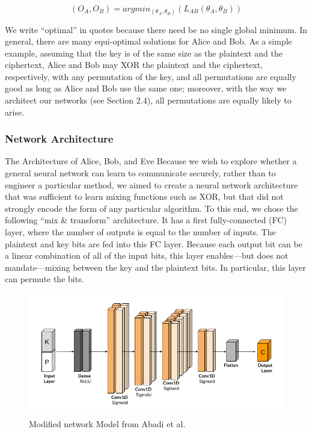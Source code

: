 \documentclass[a4paper]{article}
\begin{document}
      \[ (O_{A}, O_{B}) = argmin_{(\theta_{A}, \theta_{B})}(L_{AB}(\theta_{A}, \theta_{B})) \]
      
      We write “optimal” in quotes because there need be no single global minimum. In general, there
      are many equi-optimal solutions for Alice and Bob. As a simple example, assuming that the key is
      of the same size as the plaintext and the ciphertext, Alice and Bob may XOR the plaintext and the
      ciphertext, respectively, with any permutation of the key, and all permutations are equally good as
      long as Alice and Bob use the same one; moreover, with the way we architect our networks (see
      Section 2.4), all permutations are equally likely to arise.

      \subsubsection{Network Architecture} \label{sec:anc_netarch}
      The Architecture of Alice, Bob, and Eve Because we wish to explore whether a general neural
      network can learn to communicate securely, rather than to engineer a particular method, we aimed
      to create a neural network architecture that was sufficient to learn mixing functions such as XOR,
      but that did not strongly encode the form of any particular algorithm.
      To this end, we chose the following “mix \& transform” architecture. It has a first fully-connected
      (FC) layer, where the number of outputs is equal to the number of inputs. The plaintext and key
      bits are fed into this FC layer. Because each output bit can be a linear combination of all of the
      input bits, this layer enables—but does not mandate—mixing between the key and the plaintext bits.
      In particular, this layer can permute the bits. 

      \begin{figure}[H]
        \centering
        \includegraphics[width=\textwidth]{../ref/anclayers.png}
        \caption{Modified network Model from Abadi et al.}
        \label{fig:anclayers}
      \end{figure}
      
\end{document}
